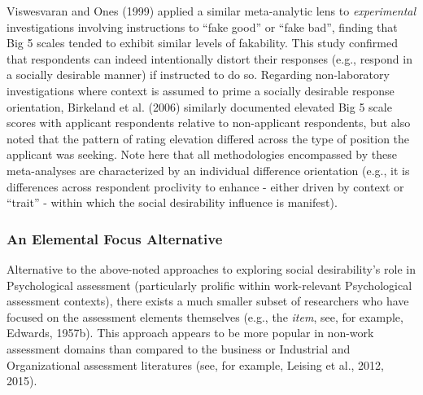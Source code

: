 \documentclass[
  ,jou]{apa6}
\begin{document}
Viswesvaran and Ones (1999) applied a similar meta-analytic lens to \emph{experimental} investigations involving instructions to ``fake good'' or ``fake bad'', finding that Big 5 scales tended to exhibit similar levels of fakability. This study confirmed that respondents can indeed intentionally distort their responses (e.g., respond in a socially desirable manner) if instructed to do so. Regarding non-laboratory investigations where context is assumed to prime a socially desirable response orientation, Birkeland et al. (2006) similarly documented elevated Big 5 scale scores with applicant respondents relative to non-applicant respondents, but also noted that the pattern of rating elevation differed across the type of position the applicant was seeking. Note here that all methodologies encompassed by these meta-analyses are characterized by an individual difference orientation (e.g., it is differences across respondent proclivity to enhance - either driven by context or ``trait'' - within which the social desirability influence is manifest).

\hypertarget{an-elemental-focus-alternative}{%
\subsubsection{An Elemental Focus Alternative}\label{an-elemental-focus-alternative}}

Alternative to the above-noted approaches to exploring social desirability's role in Psychological assessment (particularly prolific within work-relevant Psychological assessment contexts), there exists a much smaller subset of researchers who have focused on the assessment elements themselves (e.g., the \emph{item}, see, for example, Edwards, 1957b). This approach appears to be more popular in non-work assessment domains than compared to the business or Industrial and Organizational assessment literatures (see, for example, Leising et al., 2012, 2015).
\end{document}
